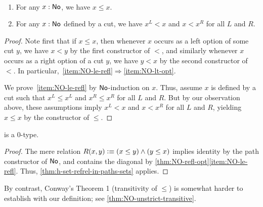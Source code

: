 \begin{thm}\label{thm:NO-refl-opt}\
  \begin{enumerate}
  \item For any $x:\mathsf{No}$, we have $x\le x$.\label{item:NO-le-refl}
  \item For any $x:\mathsf{No}$ defined by a cut, we have $x^L <x$ and $x<x^R$ for all $L$ and $R$.\label{item:NO-lt-opt}
  \end{enumerate}
\end{thm}
\begin{proof}
  Note first that if $x\le x$, then whenever $x$ occurs as a left option of some cut $y$, we have $x<y$ by the first constructor of $<$, and similarly whenever $x$ occurs as a right option of a cut $y$, we have $y<x$ by the second constructor of $<$.
  In particular,~\ref{item:NO-le-refl}$\Rightarrow$\ref{item:NO-lt-opt}.

  We prove~\ref{item:NO-le-refl} by $\mathsf{No}$-induction on $x$.
  Thus, assume $x$ is defined by a cut such that $x^L\le x^L$ and $x^R \le x^R$ for all $L$ and $R$.
  But by our observation above, these assumptions imply $x^L<x$ and $x<x^R$ for all $L$ and $R$, yielding $x\le x$ by the constructor of $\le$.
\end{proof}

\begin{cor}\label{thm:NO-set}
  \NO is a 0-type.
\end{cor}
\begin{proof}
  The mere relation $R(x,y)\vcentcolon\equiv (x\le y) \land (y\le x)$ implies identity by the path constructor of $\mathsf{No}$, and contains the diagonal by \cref{thm:NO-refl-opt}\ref{item:NO-le-refl}.
  Thus, \cref{thm:h-set-refrel-in-paths-sets} applies.
\end{proof}

By contrast, Conway's Theorem 1 (transitivity of $\le$) is somewhat harder to establish with our definition; see \cref{thm:NO-unstrict-transitive}.



